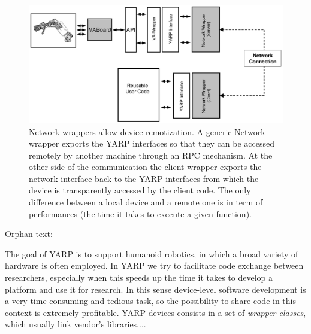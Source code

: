 \begin{figure}[tbp]
\centerline{
\includegraphics[width=24cm]{fig-devices3}
}
\caption{Network wrappers allow device remotization. A generic Network 
wrapper exports the YARP interfaces so that they can be accessed remotely 
by another machine through an RPC mechanism. At the other side of the 
communication the client wrapper exports the network interface back 
to the YARP interfaces from which the device is transparently accessed 
by the client code. The only difference between a local device and a 
remote one is in term of performances (the time it takes to execute 
a given function).
}\label{fig:devices3}
\end{figure}

Orphan text:

The goal of YARP is to support humanoid robotics, in which a broad 
variety of hardware is often employed. In YARP we try to facilitate code 
exchange between researchers, especially when this speeds up the time 
it takes to develop a platform and use it for research. In this sense 
device-level software development is a very time consuming and tedious 
task, so the possibility to share code in this context is extremely 
profitable. YARP devices consists in a set of \emph{wrapper classes}, 
which usually link vendor's libraries.... 


